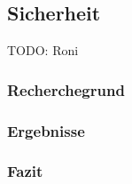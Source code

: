 \subsection{Sicherheit}

TODO: Roni

\subsubsection{Recherchegrund}


\subsubsection{Ergebnisse}



\subsubsection{Fazit}

\clearpage 





